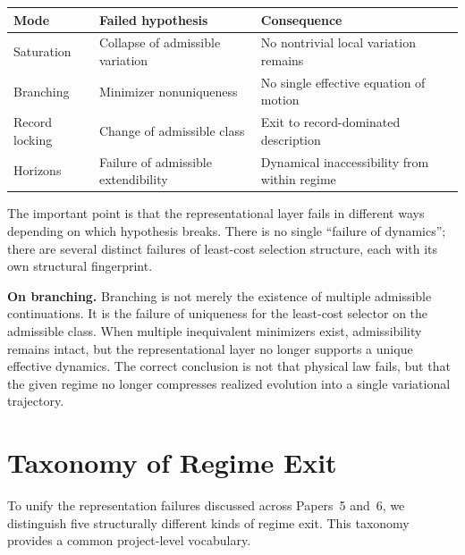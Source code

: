 \documentclass[11pt]{article}
\begin{document}
\begin{center}
\begin{tabular}{@{}lll@{}}
\toprule
Mode & Failed hypothesis & Consequence \\
\midrule
Saturation & Collapse of admissible variation & No nontrivial local variation remains \\
Branching & Minimizer nonuniqueness & No single effective equation of motion \\
Record locking & Change of admissible class & Exit to record-dominated description \\
Horizons & Failure of admissible extendibility & Dynamical inaccessibility from within regime \\
\bottomrule
\end{tabular}
\end{center}

The important point is that the representational layer fails in different ways
depending on which hypothesis breaks. There is no single ``failure of dynamics'';
there are several distinct failures of least-cost selection structure, each with
its own structural fingerprint.

\textbf{On branching.} Branching is not merely the existence of multiple
admissible continuations. It is the failure of uniqueness for the least-cost
selector on the admissible class. When multiple inequivalent minimizers exist,
admissibility remains intact, but the representational layer no longer supports
a unique effective dynamics. The correct conclusion is not that physical law
fails, but that the given regime no longer compresses realized evolution into a
single variational trajectory.

\section{Taxonomy of Regime Exit}\label{sec:exit-taxonomy}

To unify the representation failures discussed across Papers~5 and~6, we
distinguish five structurally different kinds of regime exit. This taxonomy
provides a common project-level vocabulary.
\end{document}
